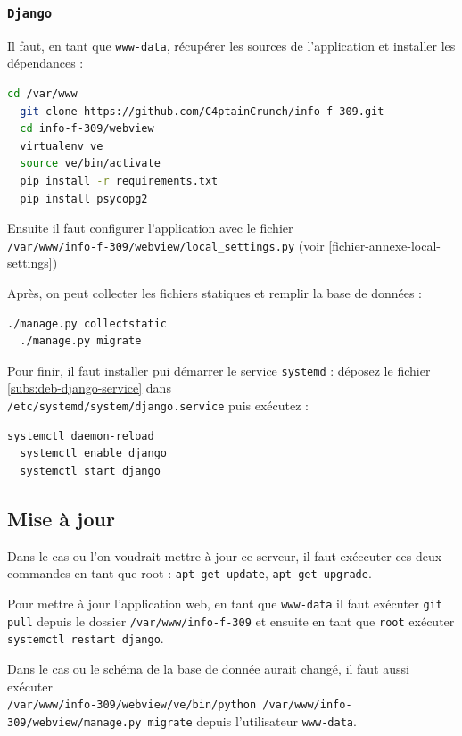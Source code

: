 \documentclass[10pt,a4paper]{article}
\begin{document}
\subsubsection{\texttt{Django}}

Il faut, en tant que \texttt{www-data}, récupérer les sources de l'application et installer les dépendances :
\begin{lstlisting}[language=bash]
  cd /var/www
  git clone https://github.com/C4ptainCrunch/info-f-309.git
  cd info-f-309/webview
  virtualenv ve
  source ve/bin/activate
  pip install -r requirements.txt
  pip install psycopg2
\end{lstlisting}

Ensuite il faut configurer l'application avec le fichier\\
\texttt{/var/www/info-f-309/webview/local\_settings.py}
(voir \ref{fichier-annexe-local-settings})

Après, on peut collecter les fichiers statiques et remplir la base de données :
\begin{lstlisting}[language=bash]
  ./manage.py collectstatic
  ./manage.py migrate
\end{lstlisting}

Pour finir, il faut installer pui démarrer le service \texttt{systemd} :
déposez le fichier \ref{subs:deb-django-service} dans \\\texttt{/etc/systemd/system/django.service} puis exécutez :
\begin{lstlisting}[language=bash]
  systemctl daemon-reload
  systemctl enable django
  systemctl start django
\end{lstlisting}


\subsection{Mise à jour}

Dans le cas ou l'on voudrait mettre à jour ce serveur,
il faut exéccuter ces deux commandes en tant que root :
\texttt{apt-get update}, \texttt{apt-get upgrade}.

Pour mettre à jour l'application web, en tant que \texttt{www-data}
il faut exécuter \texttt{git pull} depuis le dossier \texttt{/var/www/info-f-309}
et ensuite en tant que \texttt{root} exécuter \texttt{systemctl restart django}.

Dans le cas ou le schéma de la base de donnée aurait changé,
il faut aussi exécuter \\\texttt{/var/www/info-309/webview/ve/bin/python /var/www/info-309/webview/manage.py migrate} depuis l'utilisateur \texttt{www-data}.
\end{document}
